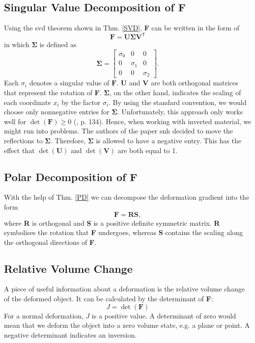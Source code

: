 {\subsection{Singular Value Decomposition of F}
\label{ss:svd_deformation_gradient}
Using the \acrshort{svd} theorem shown in Thm. \ref{SVD}, \textbf{F} can be written in the form of
\begin{equation}\label{eq:svd_gradient}
\mathbf{F} = \mathbf{U \Sigma V^\mathsf{T}}
\end{equation}
in which $\mathbf{\Sigma}$ is defined as
\begin{equation}\label{eq:svd_simga}
\mathbf{\Sigma} = \left[\begin{matrix}  \sigma_0 & 0 & 0 \\ 0 & \sigma_1 & 0 \\ 0 & 0 & \sigma_2 \end{matrix}\right] .
\end{equation}
Each $\sigma_i$ denotes a singular value of $\mathbf{F}$. \textbf{U} and $\mathbf{V}$ are both orthogonal matrices that represent the rotation of \textbf{F}. $\mathbf{\Sigma}$, on the other hand, indicates the scaling of each coordinate $x_i$ by the factor $\sigma_i$. By using the standard convention, we would choose only nonnegative entries for $\mathbf{\Sigma}$. Unfortunately, this approach only works well for $\operatorname{det}(\mathbf{F}) \geq 0$ (\cite{irving2004invertible}, p. 134). Hence, when working with inverted material, we might run into problems. The authors of the paper \acrshort{snh} decided to move the reflections to $\mathbf{\Sigma}$. Therefore, $\mathbf{\Sigma}$ is allowed to have a negative entry. This has the effect that $\operatorname{det}(\mathbf{U})$ and $\operatorname{det}(\mathbf{V})$ are both equal to 1.

\subsection{Polar Decomposition of F}
With the help of Thm. \ref{PD} we can decompose the deformation gradient into the form
\begin{equation}\label{PD_DG}
	\mathbf{F} = \mathbf{RS},
\end{equation}
where \textbf{R} is orthogonal and \textbf{S} is a positive definite symmetric matrix. \textbf{R} symbolises the rotation that \textbf{F} undergoes, whereas \textbf{S} contains the scaling along the orthogonal directions of \textbf{F}.

\subsection{Relative Volume Change}
A piece of useful information about a deformation is the relative volume change of the deformed object. It can be calculated by the determinant of \textbf{F}:
\begin{equation}\label{det_DG}
	J = \operatorname{det}(\mathbf{F})
\end{equation}
For a normal deformation, $J$ is a positive value. A determinant of zero would mean that we deform the object into a zero volume state, e.g. a plane or point. A negative determinant indicates an inversion.

}
